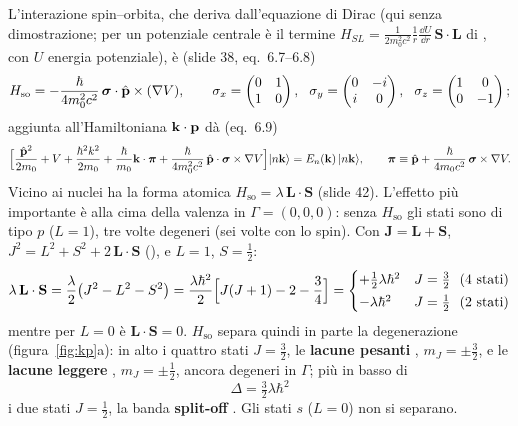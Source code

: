 \documentclass[11pt,a4paper]{article}
\begin{document}
L'interazione spin--orbita, che deriva dall'equazione di Dirac (qui senza dimostrazione; per un potenziale centrale è il termine
$H_{SL}=\frac1{2m_0^2c^2}\frac1r\frac{\dd U}{\dd r}\,\mathbf S\cdot\mathbf L$ di , con $U$ energia potenziale), è (slide 38, eq.~6.7--6.8)
\[
H_{\mathrm{so}}=-\frac{\hbar}{4m_0^2c^2}\,\boldsymbol\sigma\cdot\hp\times(\nabla V),\qquad
\sigma_x=\begin{pmatrix}0&1\\1&0\end{pmatrix},\ \ \sigma_y=\begin{pmatrix}0&-i\\i&0\end{pmatrix},\ \ \sigma_z=\begin{pmatrix}1&0\\0&-1\end{pmatrix};
\]
aggiunta all'Hamiltoniana $\mathbf k\cdot\mathbf p$ dà (eq.~6.9)
\[
\Bigl[\frac{\hat{\mathbf p}^2}{2m_0}+V+\frac{\hbar^2k^2}{2m_0}+\frac\hbar{m_0}\mathbf k\cdot\boldsymbol\pi+\frac{\hbar}{4m_0^2c^2}\,\hat{\mathbf p}\cdot\boldsymbol\sigma\times\nabla V\Bigr]|n\mathbf k\rangle
=E_n(\mathbf k)\,|n\mathbf k\rangle,\qquad\boldsymbol\pi\equiv\hat{\mathbf p}+\frac\hbar{4m_0c^2}\,\boldsymbol\sigma\times\nabla V .
\]
Vicino ai nuclei ha la forma atomica $H_{\mathrm{so}}=\lambda\,\mathbf L\cdot\mathbf S$ (slide 42). L'effetto più importante è alla cima della valenza in
$\Gamma=(0,0,0)$: senza $H_{\mathrm{so}}$ gli stati sono di tipo $p$ ($L=1$), tre volte degeneri (sei volte con lo spin). Con $\mathbf J=\mathbf L+\mathbf S$,
$J^2=L^2+S^2+2\,\mathbf L\cdot\mathbf S$ (), e $L=1$, $S=\frac12$:
\[
\lambda\,\mathbf L\cdot\mathbf S=\frac\lambda2\bigl(J^2-L^2-S^2\bigr)=\frac{\lambda\hbar^2}2\Bigl[J(J+1)-2-\frac34\Bigr]=
\begin{cases}+\frac12\lambda\hbar^2 & J=\frac32\ \ (4\ \text{stati})\\[2pt] -\lambda\hbar^2 & J=\frac12\ \ (2\ \text{stati})\end{cases}
\]
mentre per $L=0$ è $\mathbf L\cdot\mathbf S=0$. $H_{\mathrm{so}}$ separa quindi in parte la degenerazione (figura~\ref{fig:kp}a): in alto i quattro stati
$J=\frac32$, le \textbf{lacune pesanti} , $m_J=\pm\frac32$, e le \textbf{lacune leggere} , $m_J=\pm\frac12$, ancora
degeneri in $\Gamma$; più in basso di
\[
\Delta=\tfrac32\lambda\hbar^2
\]
i due stati $J=\frac12$, la banda \textbf{split-off} . Gli stati $s$ ($L=0$) non si separano.
\end{document}
